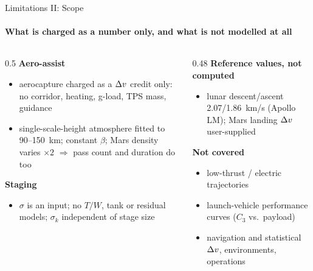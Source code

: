 \documentclass[aspectratio=169,10pt]{beamer}
\begin{document}
\begin{frame}{Limitations II: Scope}
  \framesubtitle{What is charged as a number only, and what is not modelled at all}
\begin{columns}[T]
\begin{column}{0.5\textwidth}
\textbf{Aero-assist}
\begin{itemize}
\item aerocapture charged as a $\Delta v$ credit only: no corridor, heating, g-load, TPS mass, guidance
\item single-scale-height atmosphere fitted to 90--150~km; constant $\beta$; Mars density varies $\times2$ $\Rightarrow$ pass count and duration do too
\end{itemize}
\textbf{Staging}
\begin{itemize}
\item $\sigma$ is an input; no $T/W$, tank or residual models; $\sigma_k$ independent of stage size
\end{itemize}
\end{column}
\begin{column}{0.48\textwidth}
\textbf{Reference values, not computed}
\begin{itemize}
\item lunar descent/ascent 2.07/1.86~km/s (Apollo LM); Mars landing $\Delta v$ user-supplied
\end{itemize}
\textbf{Not covered}
\begin{itemize}
\item low-thrust / electric trajectories
\item launch-vehicle performance curves ($C_3$ vs.\ payload)
\item navigation and statistical $\Delta v$, environments, operations
\end{itemize}
\end{column}
\end{columns}
\end{frame}

\end{document}
